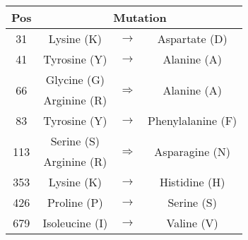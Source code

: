 \begin{table}[ht]
  \centering
  \begin{tabular}[t]{ c | c  c  c }
    \hline
    \textbf{Pos} & \multicolumn{3}{c}{\textbf{Mutation}} \\
    \hline
    31 & Lysine (K) & $\to$ & Aspartate (D){\rule{0pt}{2.6ex}} \\[1mm]
    41 & Tyrosine (Y) & $\to$ & Alanine (A) \\[1mm]
    \multirow{2}{*}{66} & Glycine (G) & \multirow{2}{*}{$\Rightarrow$} & \multirow{2}{*}{Alanine (A)} \\
    & Arginine (R) \\[1mm]
    83 & Tyrosine (Y) & $\to$ & Phenylalanine (F) \\[1mm]
    \multirow{2}{*}{113} & Serine (S) & \multirow{2}{*}{$\Rightarrow$} & \multirow{2}{*}{Asparagine (N)} \\
    & Arginine (R) \\[1mm]
    353 & Lysine (K) & $\to$ & Histidine (H) \\[1mm]
    426 & Proline (P) & $\to$ & Serine (S) \\[1mm]
    679 & Isoleucine (I) & $\to$ & Valine (V) \\[1mm]
    \hline
  \end{tabular}
\end{table}